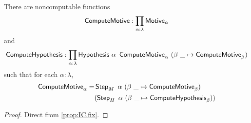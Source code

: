 \begin{theorem}
  \label{thm:model_construction}
  There are noncomputable functions
  \[ \operatorname{\mathsf{ComputeMotive}} : \prod_{\alpha : \lambda} \mathsf{Motive}_\alpha \]
  and
  \[ \newoperator{ComputeHypothesis} : \prod_{\alpha : \lambda} \Hypothesis\ \alpha\ \newoperator{ComputeMotive}_\alpha\ (\beta\ \_ \mapsto \newoperator{ComputeMotive}_\beta) \]
  such that for each \( \alpha : \lambda \),
  \begin{align*}
    \newoperator{ComputeMotive}_\alpha = &\newoperator{Step}_M\ \alpha\ (\beta\ \_ \mapsto \newoperator{ComputeMotive}_\beta)\\
    &(\newoperator{Step}_H\ \alpha\ (\beta\ \_ \mapsto \newoperator{ComputeHypothesis}_\beta))
  \end{align*}
\end{theorem}
\begin{proof}
  Direct from \cref{prop:IC.fix}.
\end{proof}
